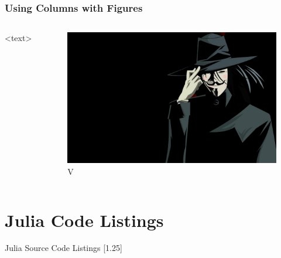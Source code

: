 \documentclass{beamer}
\begin{document}
\begin{frame}
	\frametitle{Using Columns with Figures}
	\begin{columns}
		<text>
\begin{figure}
	\includegraphics[scale=0.3]{figures/V.jpg}
	\caption{V}
\end{figure}
	\end{columns}
\end{frame}

\section{Julia Code Listings}
\begin{frame}{Julia Source Code Listings}
	\scalebox{1.0}[1.25]{
	}
\end{frame}
\end{document}
